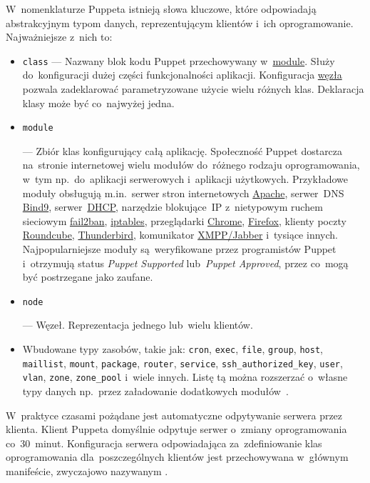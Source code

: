 \documentclass[thesis]{subfiles}
\begin{document}
W~nomenklaturze Puppeta istnieją słowa kluczowe, które odpowiadają abstrakcyjnym typom danych, reprezentującym klientów i~ich oprogramowanie. Najważniejsze z~nich to:\mynobreakpar
\begin{itemize}
\item \texttt{class} --- Nazwany blok kodu Puppet przechowywany w~\hyperlink{itm:puppetmodule}{module}. Służy do~konfiguracji dużej części funkcjonalności aplikacji. Konfiguracja \hyperlink{itm:puppetnode}{węzła} pozwala zadeklarować parametryzowane użycie wielu różnych klas. Deklaracja klasy może być co~najwyżej jedna.
\item \hypertarget{itm:puppetmodule}{\texttt{module}} --- Zbiór klas konfigurujący całą aplikację. Społeczność Puppet dostarcza na~stronie internetowej  wielu modułów do~różnego rodzaju oprogramowania, w~tym np.~do~aplikacji serwerowych i~aplikacji użytkowych. Przykładowe moduły obsługują m.in.~serwer stron internetowych \href{https://forge.puppet.com/puppetlabs/apache}{Apache}, serwer~DNS \href{https://forge.puppet.com/ajjahn/dns}{Bind9}, serwer~\href{https://forge.puppet.com/theforeman/dhcp}{DHCP}, narzędzie blokujące~IP z~nietypowym ruchem sieciowym \href{https://forge.puppet.com/netmanagers/fail2ban}{fail2ban}, \href{https://forge.puppet.com/example42/iptables}{iptables}, przeglądarki \href{https://forge.puppet.com/jamesnetherton/google_chrome}{Chrome}, \href{https://forge.puppet.com/h4x/firefox}{Firefox}, klienty poczty \href{https://forge.puppet.com/hetzner/roundcube}{Roundcube}, \href{https://forge.puppet.com/jgoettsch/thunderbird}{Thunderbird}, komunikator \href{https://forge.puppet.com/jamtur01/xmpp}{XMPP/Jabber} i~tysiące innych. Najpopularniejsze moduły są~weryfikowane przez programistów Puppet i~otrzymują status \emph{Puppet Supported} lub~\emph{Puppet Approved}, przez co~mogą być postrzegane jako zaufane.
\item \hypertarget{itm:puppetnode}{\texttt{node}} --- Węzeł. Reprezentacja jednego lub~wielu klientów.
\item Wbudowane typy zasobów, takie jak: \texttt{cron}, \texttt{exec}, \texttt{file}, \texttt{group}, \texttt{host}, \texttt{maillist}, \texttt{mount}, \texttt{package}, \texttt{router}, \texttt{service}, \texttt{ssh\_authorized\_key}, \texttt{user}, \texttt{vlan}, \texttt{zone}, \texttt{zone\_pool} i~wiele innych. Listę tą można rozszerzać o~własne typy danych np.~przez załadowanie dodatkowych modułów~\cite{puppet-resources-types}.
\end{itemize}
W~praktyce czasami pożądane jest automatyczne odpytywanie serwera przez klienta. Klient Puppeta domyślnie odpytuje serwer o~zmiany oprogramowania co~30~minut. Konfiguracja serwera odpowiadająca za~zdefiniowanie klas oprogramowania dla~poszczególnych klientów jest przechowywana w~głównym manifeście, zwyczajowo nazywanym \href{https://docs.puppet.com/puppet/latest/dirs_manifest.html#directories:-the-main-manifest(s)}{}.
\end{document}
